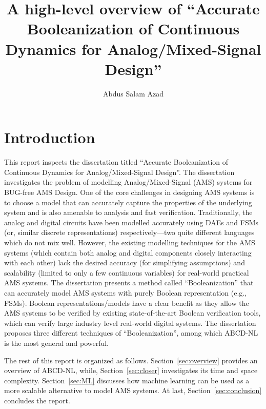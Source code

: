 \documentclass[a4paper]{article}
\title{A high-level overview of ``Accurate Booleanization of Continuous Dynamics for Analog/Mixed-Signal Design''}
\author{Abdus Salam Azad}
\begin{document}
\maketitle


\section{Introduction}\label{sec:intro}
This report inspects the dissertation titled ``Accurate Booleanization of Continuous Dynamics for Analog/Mixed-Signal Design''. The dissertation investigates the problem of modelling Analog/Mixed-Signal (AMS) systems for BUG-free AMS Design. One of the core challenges in designing AMS systems is to choose a model that can accurately capture the properties of the underlying system and is also amenable to analysis and fast verification. Traditionally, the analog and digital circuits have been modelled accurately using DAEs and FSMs (or, similar discrete representations) respectively---two quite different languages which do not mix well. However, the existing modelling techniques for the AMS systems (which contain both analog and digital components closely interacting with each other) lack the desired accuracy (for simplifying assumptions) and scalability (limited to only a few continuous variables) for real-world practical AMS systems. The dissertation presents a method called ``Booleanization'' that can accurately model AMS systems with purely Boolean representation (e.g., FSMs). Boolean representations/models have a clear benefit as they allow the AMS systems to be verified by existing state-of-the-art Boolean verification tools, which can verify large industry level real-world digital systems. The dissertation proposes three different techniques of ``Booleanization'', among which ABCD-NL is the most general and powerful. 

The rest of this report is organized as follows. Section~\ref{sec:overview} provides an overview of ABCD-NL, while, Section~\ref{sec:closer} investigates its time and space complexity. Section~\ref{sec:ML} discusses how machine learning can be used as a more scalable alternative to model AMS systems. At last, Section~\ref{sec:conclusion} concludes the report.
\end{document}

